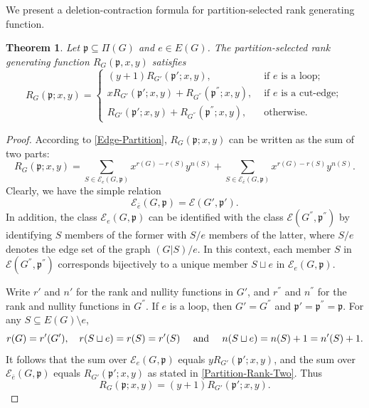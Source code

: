 \documentclass[12pt]{article}%
\numberwithin{equation}{section}
\def\And{\mbox{\rm ~and~}}
\newtheorem{theorem}{Theorem}[section]
\begin{document}
We present a deletion-contraction formula for partition-selected rank generating function.
\begin{theorem}\label{Partition-Rank-DC}
Let $\mathfrak{p}\subseteq\Pi(G)$ and $e\in E(G)$. The partition-selected rank generating function $R_G(\mathfrak{p},x,y)$ satisfies
\[
R_G(\mathfrak{p};x,y)=\begin{cases}
(y+1)R_{G'}(\mathfrak{p}';x,y),&\text{ if } e \text{ is a loop};\\
xR_{G'}(\mathfrak{p}';x,y)+R_{G^{''}}(\mathfrak{p}^{''};x,y),&\text{ if } e \text{ is a cut-edge};\\
R_{G'}(\mathfrak{p}';x,y)+R_{G^{''}}(\mathfrak{p}^{''};x,y),&\text{ otherwise}.
\end{cases}
\]
\end{theorem}
\begin{proof}
According to \eqref{Edge-Partition},  $R_G(\mathfrak{p};x,y)$ can be written as the sum of two parts:
\begin{equation}\label{Partition-Rank-Two}
R_G(\mathfrak{p};x,y)=\sum_{S\in \mathcal{E}_e(G,\mathfrak{p})}x^{r(G)-r(S)}y^{n(S)}+\sum_{S\in \mathcal{E}_{\bar{e}}(G,\mathfrak{p})}x^{r(G)-r(S)}y^{n(S)}.
\end{equation}
Clearly, we have the simple relation
\begin{equation*}\label{Partition-e}
\mathcal{E}_{\bar{e}}(G,\mathfrak{p})=\mathcal{E}(G',\mathfrak{p}').
\end{equation*}
In addition, the class $\mathcal{E}_e(G,\mathfrak{p})$ can be identified with the class $\mathcal{E}(G^{''},\mathfrak{p}^{''})$ by identifying $S$ members of the former with $S/e$ members of the latter, where $S/e$ denotes the edge set of the graph $(G|S)/e$. In this context, each member $S$ in $\mathcal{E}(G^{''},\mathfrak{p}^{''})$ corresponds bijectively to a unique member $S\sqcup e$ in $\mathcal{E}_e(G,\mathfrak{p})$.

Write $r'$ and $n'$ for the rank and nullity functions in $G'$, and $r^{''}$ and $n^{''}$ for the rank and nullity functions in $G^{''}$. If $e$ is a loop, then $G'=G^{''}$ and $\mathfrak{p}'=\mathfrak{p}^{''}=\mathfrak{p}$. For any $S\subseteq E(G)\setminus e$, 
\begin{equation*}\label{Rank-Nullity-Relation1}
r(G)=r'(G'),\quad r(S\sqcup e)=r(S)=r'(S)\quad\And\quad n(S\sqcup e)=n(S)+1=n'(S)+1.
\end{equation*}
It follows that the sum over $\mathcal{E}_e(G,\mathfrak{p})$ equals $yR_{G'}(\mathfrak{p}';x,y)$, and the sum over $\mathcal{E}_{\bar{e}}(G,\mathfrak{p})$ equals $R_{G'}(\mathfrak{p}';x,y)$ as stated in \eqref{Partition-Rank-Two}. Thus
\[
R_G(\mathfrak{p};x,y)=(y+1)R_{G'}(\mathfrak{p}';x,y).
\]


\end{proof}
\end{document}
